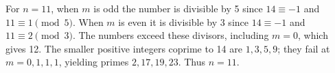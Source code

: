 For $n=11$, when $m$ is odd the number is divisible by 5 since $14\equiv-1$ and $11\equiv1\pmod5$. When $m$ is even it is divisible by 3 since $14\equiv-1$ and $11\equiv2\pmod3$. The numbers exceed these divisors, including $m=0$, which gives 12. The smaller positive integers coprime to 14 are $1,3,5,9$; they fail at $m=0,1,1,1$, yielding primes $2,17,19,23$. Thus $\boxed{n=11}$.

